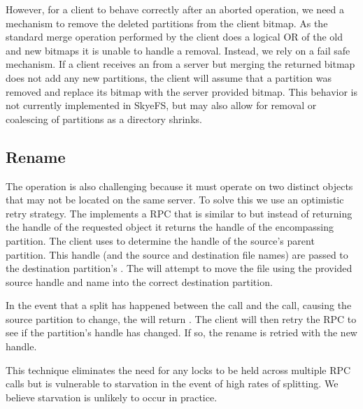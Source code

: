 \documentclass[onecolumn, 11pt, letterpaper]{article}
\begin{document}
However, for a client to behave correctly after an aborted 
operation, we need a mechanism to remove the deleted partitions from the
client bitmap.  As the standard merge operation performed by the client does a
logical OR of the old and new bitmaps it is unable to handle a removal.
Instead, we rely on a fail safe mechanism.  If a
client receives an  from a server but merging the returned bitmap
does not add any new partitions, the client will assume that a partition was
removed and replace its bitmap with the server provided
bitmap.  This behavior is not currently implemented in SkyeFS, but may also
allow for removal or coalescing of partitions as a directory shrinks.

\subsection{Rename}
The  operation is also challenging because it must operate on two
distinct objects that may not be located on the same server.  To solve this we
use an optimistic retry strategy.  The  implements a
 RPC that is similar to  but instead of returning
the handle of the requested object it returns the handle of the encompassing
partition.  The client uses  to determine the handle of the
source's parent partition.  This handle (and the source and destination file names)
are passed to the destination partition's .  The
 will attempt to move the file using the provided source
handle and name into the correct destination partition.  

In the event that a split has happened between the  call and
the  call, causing the source partition to change, the
 will return .  The client will then retry the
 RPC to see if the partition's handle has changed.  If so, the
rename is retried with the new handle.

This technique eliminates the need for any locks to be held across multiple RPC
calls but is vulnerable to starvation in the event of high rates of splitting.
We believe starvation is unlikely to occur in practice.
\end{document}
